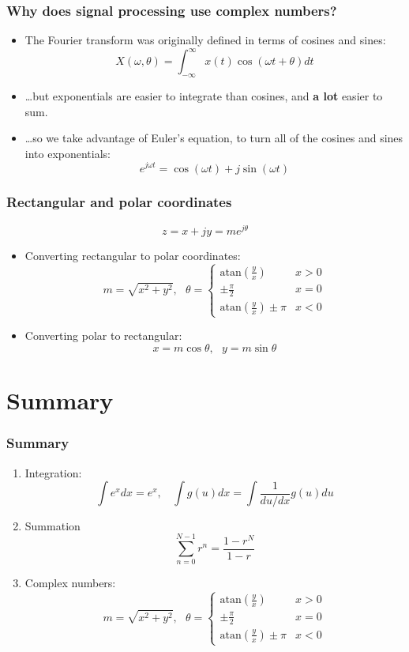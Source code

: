 \documentclass{beamer}
\begin{document}
\begin{frame}
  \frametitle{Why does signal processing use complex numbers?}
  \begin{itemize}
  \item The Fourier transform was originally defined in terms of cosines and sines:
    \[
    X(\omega,\theta) = \int_{-\infty}^\infty x(t) \cos(\omega t+\theta)dt
    \]
  \item \ldots but exponentials are easier to integrate than cosines, and {\bf a lot} easier to
    sum.
  \item \ldots so we take advantage of Euler's equation, to turn all of the
    cosines and sines into exponentials:
    \[
    e^{j\omega t} = \cos(\omega t) + j\sin(\omega t)
    \]
  \end{itemize}
\end{frame}

\begin{frame}
  \frametitle{Rectangular and polar coordinates}
  \[
  z = x+jy = me^{j\theta}
  \]
  \begin{itemize}
  \item Converting rectangular to polar coordinates:
    \[
    m = \sqrt{x^2+y^2},~~~
    \theta =
    \begin{cases}
      \mbox{atan}\left(\frac{y}{x}\right) & x>0\\
      \pm \frac{\pi}{2} & x=0\\
      \mbox{atan}\left(\frac{y}{x}\right) \pm\pi & x<0
    \end{cases}
    \]
  \item Converting polar to rectangular:
    \[
    x=m\cos\theta,~~~y=m\sin\theta
    \]
  \end{itemize}
\end{frame}

\section{Summary}
\begin{frame}
  \frametitle{Summary}
  \begin{enumerate}
  \item Integration:
    \[
    \int e^xdx = e^x,~~~~\int g(u)dx=\int\frac{1}{du/dx}g(u)du
    \]
  \item Summation
    \[
    \sum_{n=0}^{N-1} r^n = \frac{1-r^N}{1-r}
    \]
  \item Complex numbers:
    \[
    m = \sqrt{x^2+y^2},~~~
    \theta =
    \begin{cases}
      \mbox{atan}\left(\frac{y}{x}\right) & x>0\\
      \pm \frac{\pi}{2} & x=0\\
      \mbox{atan}\left(\frac{y}{x}\right) \pm\pi & x<0
    \end{cases}
    \]
  \end{enumerate}
\end{frame}
\end{document}
